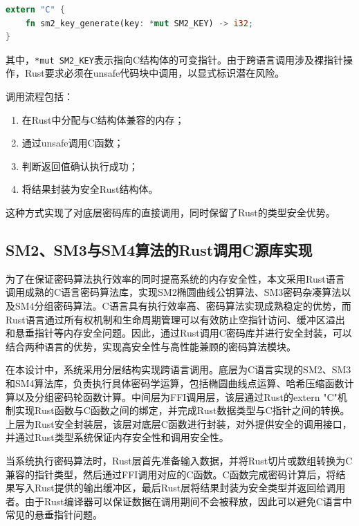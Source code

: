 \begin{lstlisting}[language=Rust, caption={ML-KEM 基础调用示例}]
extern "C" {
    fn sm2_key_generate(key: *mut SM2_KEY) -> i32;
}
\end{lstlisting}

其中，\texttt{*mut SM2\_KEY}表示指向C结构体的可变指针。由于跨语言调用涉及裸指针操作，Rust要求必须在unsafe代码块中调用，以显式标识潜在风险。

调用流程包括：

\begin{enumerate}
\item 在Rust中分配与C结构体兼容的内存；
\item 通过unsafe调用C函数；
\item 判断返回值确认执行成功；
\item 将结果封装为安全Rust结构体。
\end{enumerate}

这种方式实现了对底层密码库的直接调用，同时保留了Rust的类型安全优势。


\subsection{SM2、SM3与SM4算法的Rust调用C源库实现}

为了在保证密码算法执行效率的同时提高系统的内存安全性，本文采用Rust语言调用成熟的C语言密码算法库，实现SM2椭圆曲线公钥算法、SM3密码杂凑算法以及SM4分组密码算法。C语言具有执行效率高、密码算法实现成熟稳定的优势，而Rust语言通过所有权机制和生命周期管理可以有效防止空指针访问、缓冲区溢出和悬垂指针等内存安全问题。因此，通过Rust调用C密码库并进行安全封装，可以结合两种语言的优势，实现高安全性与高性能兼顾的密码算法模块。

在本设计中，系统采用分层结构实现跨语言调用。底层为C语言实现的SM2、SM3和SM4算法库，负责执行具体密码学运算，包括椭圆曲线点运算、哈希压缩函数计算以及分组密码轮函数计算。中间层为FFI调用层，该层通过Rust的extern "C"机制实现Rust函数与C函数之间的绑定，并完成Rust数据类型与C指针之间的转换。上层为Rust安全封装层，该层对底层C函数进行封装，对外提供安全的调用接口，并通过Rust类型系统保证内存安全性和调用安全性。

当系统执行密码算法时，Rust层首先准备输入数据，并将Rust切片或数组转换为C兼容的指针类型，然后通过FFI调用对应的C函数。C函数完成密码计算后，将结果写入Rust提供的输出缓冲区，最后Rust层将结果封装为安全类型并返回给调用者。由于Rust编译器可以保证数据在调用期间不会被释放，因此可以避免C语言中常见的悬垂指针问题。

